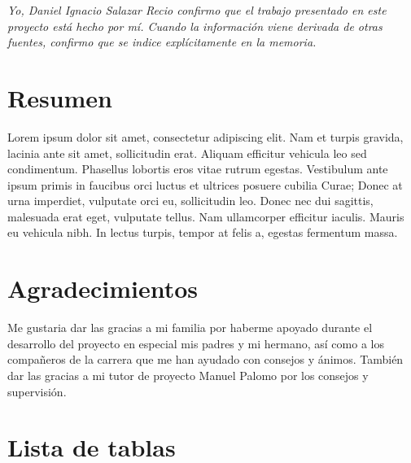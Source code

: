 \documentclass[12pt,a4paperpaper,]{report}
\begin{document}
\vspace*{\fill} \noindent
\textit{
Yo, Daniel Ignacio Salazar Recio confirmo que el trabajo presentado en este proyecto está hecho por mí. Cuando la información viene derivada de otras fuentes, confirmo que se indice explícitamente en la memoria.
} \vspace*{\fill} 

\chapter*{Resumen}\label{resumen}

Lorem ipsum dolor sit amet, consectetur adipiscing elit. Nam et turpis
gravida, lacinia ante sit amet, sollicitudin erat. Aliquam efficitur
vehicula leo sed condimentum. Phasellus lobortis eros vitae rutrum
egestas. Vestibulum ante ipsum primis in faucibus orci luctus et
ultrices posuere cubilia Curae; Donec at urna imperdiet, vulputate orci
eu, sollicitudin leo. Donec nec dui sagittis, malesuada erat eget,
vulputate tellus. Nam ullamcorper efficitur iaculis. Mauris eu vehicula
nibh. In lectus turpis, tempor at felis a, egestas fermentum massa.

 \setcounter{page}{1}

\chapter*{Agradecimientos}\label{agradecimientos}

Me gustaria dar las gracias a mi familia por haberme apoyado durante el
desarrollo del proyecto en especial mis padres y mi hermano, así como a
los compañeros de la carrera que me han ayudado con consejos y ánimos.
También dar las gracias a mi tutor de proyecto Manuel Palomo por los
consejos y supervisión.

\newpage


\tableofcontents

\newpage

 \setcounter{page}{3}

\newpage

\chapter*{Lista de tablas}\label{lista-de-tablas}
\end{document}
